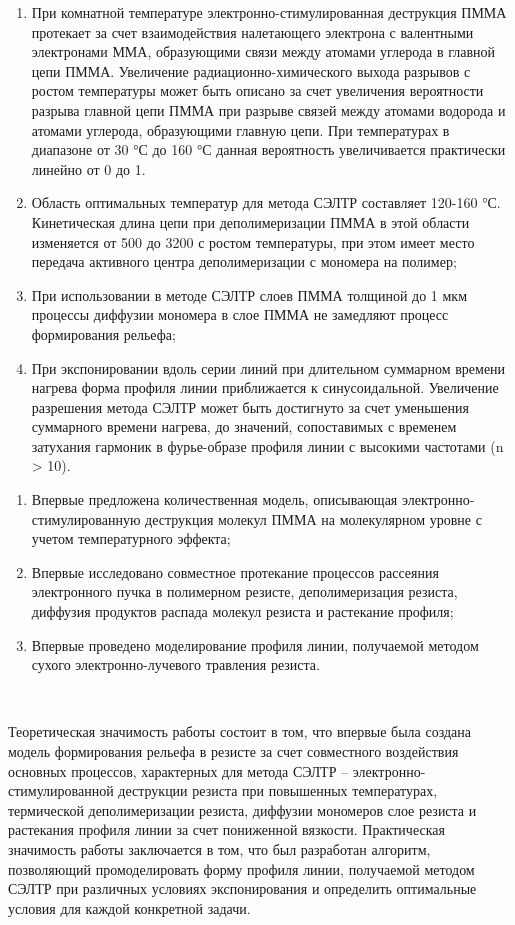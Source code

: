 \begin{enumerate}
	\item При комнатной температуре электронно-стимулированная деструкция ПММА протекает за счет взаимодействия налетающего электрона с валентными электронами ММА, образующими связи между атомами углерода в главной цепи ПММА. Увеличение радиационно-химического выхода разрывов с ростом температуры может быть описано за счет увеличения вероятности разрыва главной цепи ПММА при разрыве связей между атомами водорода и атомами углерода, образующими главную цепи. При температурах в диапазоне от 30 °С до 160 °С данная вероятность увеличивается практически линейно от 0 до 1.
	\item Область оптимальных температур для метода СЭЛТР составляет 120-160 °С. Кинетическая длина цепи при деполимеризации ПММА в этой области изменяется от 500 до 3200 с ростом температуры, при этом имеет место передача активного центра деполимеризации с мономера на полимер;
	\item При использовании в методе СЭЛТР слоев ПММА толщиной до 1 мкм процессы диффузии мономера в слое ПММА не замедляют процесс формирования рельефа;
	\item При экспонировании вдоль серии линий при длительном суммарном времени нагрева форма профиля линии приближается к синусоидальной. Увеличение разрешения метода СЭЛТР может быть достигнуто за счет уменьшения суммарного времени нагрева, до значений, сопоставимых с временем затухания гармоник в фурье-образе профиля линии с высокими частотами (n > 10).
\end{enumerate}


\novelty

\begin{enumerate}
  \item Впервые предложена количественная модель, описывающая электронно-стимулированную деструкция молекул ПММА на молекулярном уровне с учетом температурного эффекта;
  \item Впервые исследовано совместное протекание процессов рассеяния электронного пучка в полимерном резисте, деполимеризация резиста, диффузия продуктов распада молекул резиста и растекание профиля;
  \item Впервые проведено моделирование профиля линии, получаемой методом сухого электронно-лучевого травления резиста.
\end{enumerate}


\influence\

Теоретическая значимость работы состоит в том, что впервые была создана модель формирования рельефа в резисте за счет совместного воздействия основных процессов, характерных для метода СЭЛТР – электронно-стимулированной деструкции резиста при повышенных температурах, термической деполимеризации резиста, диффузии мономеров слое резиста и растекания профиля линии за счет пониженной вязкости. Практическая значимость работы заключается в том, что был разработан алгоритм, позволяющий промоделировать форму профиля линии, получаемой методом СЭЛТР при различных условиях экспонирования и определить оптимальные условия для каждой конкретной задачи.


